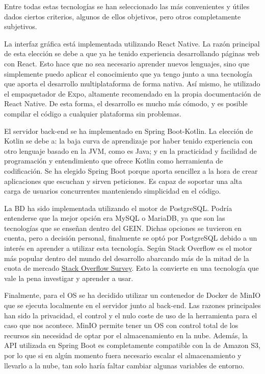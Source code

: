Entre todas estas tecnologías se han seleccionado las más convenientes y útiles dados ciertos criterios, algunos de ellos objetivos, pero otros completamente subjetivos.

La interfaz gráfica está implementada utilizando React Native. La razón principal de esta elección se debe a que ya he tenido experiencia desarrollando páginas web con React. Esto hace que no sea necesario aprender nuevos lenguajes, sino que simplemente puedo aplicar el conocimiento que ya tengo junto a una tecnología que aporta el desarrollo multiplataforma de forma nativa. Así mismo, he utilizado el empaquetador de Expo, altamente recomendado en la propia documentación de React Native. De esta forma, el desarrollo es mucho más cómodo, y es posible compilar el código a cualquier plataforma sin problemas.

El servidor back-end se ha implementado en Spring Boot-Kotlin. La elección de Kotlin se debe a: la baja curva de aprendizaje por haber tenido experiencia con otro lenguaje basado en la JVM, como es Java; y en la practicidad y facilidad de programación y entendimiento que ofrece Kotlin como herramienta de codificación. Se ha elegido Spring Boot porque aporta sencillez a la hora de crear aplicaciones que escuchan y sirven peticiones. Es capaz de soportar una alta carga de usuarios concurrentes manteniendo simplicidad en el código.

La \ac{BD} ha sido implementada utilizando el motor de PostgreSQL. Podría entenderse que la mejor opción era MySQL o MariaDB, ya que son las tecnologías que se enseñan dentro del \ac{GEIN}. Dichas opciones se tuvieron en cuenta, pero a decisión personal, finalmente se optó por PostgreSQL debido a un interés en aprender a utilizar esta tecnología. Según Stack Overflow es el motor más popular dentro del mundo del desarrollo abarcando más de la mitad de la cuota de mercado \href{https://survey.stackoverflow.co/2025/technology#1-databases}{Stack Overflow Survey}. Esto la convierte en una tecnología que vale la pena investigar y aprender a usar.

Finalmente, para el \ac{OS} se ha decidido utilizar un contenedor de Docker de MinIO que se ejecuta localmente en el servidor junto al back-end. Las razones principales han sido la privacidad, el control y el nulo coste de uso de la herramienta para el caso que nos acontece. MinIO permite tener un \ac{OS} con control total de los recursos sin necesidad de optar por el almacenamiento en la nube. Además, la API utilizada en Spring Boot es completamente compatible con la de Amazon S3, por lo que si en algún momento fuera necesario escalar el almacenamiento y llevarlo a la nube, tan solo haría faltar cambiar algunas variables de entorno.